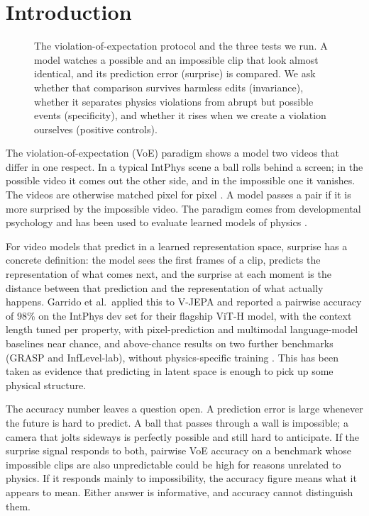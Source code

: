 \section{Introduction}
\label{sec:intro}
\begin{figure}[t]
\centering
{}
\caption{The violation-of-expectation protocol and the three tests we run. A model watches a possible and an impossible clip that look almost identical, and its prediction error (surprise) is compared. We ask whether that comparison survives harmless edits (invariance), whether it separates physics violations from abrupt but possible events (specificity), and whether it rises when we create a violation ourselves (positive controls).}
\label{fig:f0}
\end{figure}

The violation-of-expectation (VoE) paradigm shows a model two videos that differ in one respect. In a typical IntPhys scene a ball rolls behind a screen; in the possible video it comes out the other side, and in the impossible one it vanishes. The videos are otherwise matched pixel for pixel \cite{riochet2022}. A model passes a pair if it is more surprised by the impossible video. The paradigm comes from developmental psychology and has been used to evaluate learned models of physics \cite{piloto2022,weihs2022}.

For video models that predict in a learned representation space, surprise has a concrete definition: the model sees the first frames of a clip, predicts the representation of what comes next, and the surprise at each moment is the distance between that prediction and the representation of what actually happens. Garrido et al.\ applied this to V-JEPA \cite{bardes2024} and reported a pairwise accuracy of 98\% on the IntPhys dev set for their flagship ViT-H model, with the context length tuned per property, with pixel-prediction and multimodal language-model baselines near chance, and above-chance results on two further benchmarks (GRASP and InfLevel-lab), without physics-specific training \cite{garrido2025}. This has been taken as evidence that predicting in latent space is enough to pick up some physical structure.

The accuracy number leaves a question open. A prediction error is large whenever the future is hard to predict. A ball that passes through a wall is impossible; a camera that jolts sideways is perfectly possible and still hard to anticipate. If the surprise signal responds to both, pairwise VoE accuracy on a benchmark whose impossible clips are also unpredictable could be high for reasons unrelated to physics. If it responds mainly to impossibility, the accuracy figure means what it appears to mean. Either answer is informative, and accuracy cannot distinguish them.

